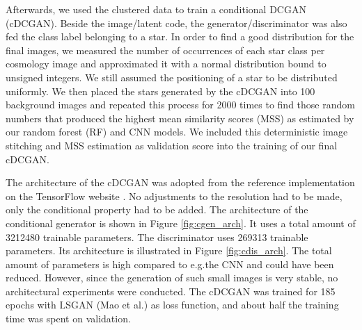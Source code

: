 \documentclass[10pt,conference,compsocconf]{IEEEtran}
\begin{document}
Afterwards, we used the clustered data to train a conditional DCGAN (cDCGAN). Beside the image/latent code, the generator/discriminator was also fed the class label belonging to a star. In order to find a good distribution for the final images, we measured the number of occurrences of each star class per cosmology image and approximated it with a normal distribution bound to unsigned integers. We still assumed the positioning of a star to be distributed uniformly. We then placed the stars generated by the cDCGAN into \SI{100}{} background images and repeated this process for \SI{2000}{} times to find those random numbers that produced the highest mean similarity scores (MSS) as estimated by our random forest (RF) and CNN models. We included this deterministic image stitching and MSS estimation as validation score into the training of our final cDCGAN.

The architecture of the cDCGAN was adopted from the reference implementation on the TensorFlow website \cite{dcgantf}. No adjustments to the resolution had to be made, only the conditional property had to be added. The architecture of the conditional generator is shown in Figure \ref{fig:cgen_arch}. It uses a total amount of \SI{3212480}{} trainable parameters. The discriminator uses \SI{269313}{} trainable parameters. Its architecture is illustrated in Figure \ref{fig:cdis_arch}. The total amount of parameters is high compared to e.g.\@ the CNN and could have been reduced. However, since the generation of such small images is very stable, no architectural experiments were conducted. The cDCGAN was trained for 185 epochs with LSGAN (Mao et al.\@ \cite{lsgan}) as loss function, and about half the training time was spent on validation.
\end{document}
